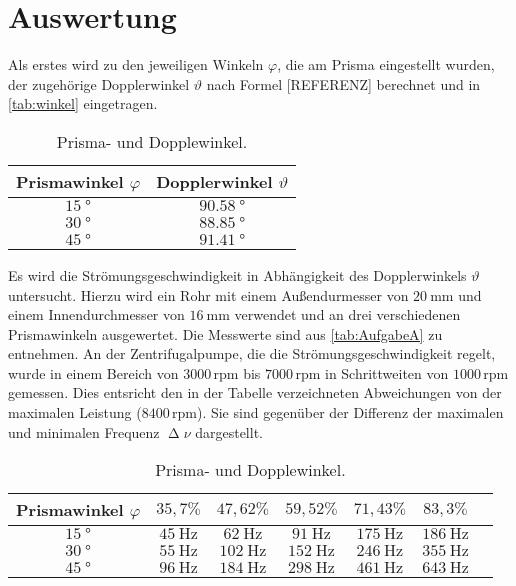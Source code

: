 \section{Auswertung}
\label{sec:Auswertung}

Als erstes wird zu den jeweiligen Winkeln $\varphi$, die am Prisma eingestellt wurden, der zugehörige Dopplerwinkel $\vartheta$ nach Formel [REFERENZ]
berechnet und in \autoref{tab:winkel} eingetragen.
\begin{table}[H]
  \centering
  \caption{Prisma- und Dopplewinkel.}
  \label{tab:winkel}
  \begin{tabular}{c c}
    \toprule
    Prismawinkel $\varphi$ & Dopplerwinkel $\vartheta$ \\
    \midrule
    $\SI{15}{\degree}$ & $\SI{90,58}{\degree}$ \\
    $\SI{30}{\degree}$ & $\SI{88,85}{\degree}$ \\
    $\SI{45}{\degree}$ & $\SI{91,41}{\degree}$ \\
    \bottomrule
  \end{tabular}
\end{table}

\noindent
Es wird die Strömungsgeschwindigkeit in Abhängigkeit des Dopplerwinkels $\vartheta$ untersucht. Hierzu wird ein Rohr mit einem Außendurmesser von $\SI{20}{\milli\meter}$
und einem Innendurchmesser von $\SI{16}{\milli\meter}$ verwendet und an drei verschiedenen Prismawinkeln ausgewertet. Die Messwerte sind aus \autoref{tab:AufgabeA} zu entnehmen.
An der Zentrifugalpumpe, die die Strömungsgeschwindigkeit regelt, wurde in einem Bereich von $3000 \,\text{rpm}$ bis $7000 \,\text{rpm}$ in Schrittweiten von $1000 \,\text{rpm}$ gemessen. Dies entsricht den in der
Tabelle verzeichneten Abweichungen von der maximalen Leistung ($8400\, \text{rpm}$). Sie sind gegenüber der Differenz der maximalen und minimalen Frequenz $\upDelta \nu$ dargestellt.
\begin{table}[H]
  \centering
  \caption{Prisma- und Dopplewinkel.}
  \label{tab:AufgabeA}
  \begin{tabular}{c c c c c c c}
    \toprule
    Prismawinkel $\varphi$ & $35,7 \%$ & $47,62 \%$ & $59,52 \%$ & $71,43 \%$ & $83,3 \%$\\
    \midrule
    $\SI{15}{\degree}$ & $\SI{45}{\hertz}$ & $\SI{62}{\hertz}$ & $\SI{91}{\hertz}$ & $\SI{175}{\hertz}$ & $\SI{186}{\hertz}$ \\
    $\SI{30}{\degree}$ & $\SI{55}{\hertz}$ & $\SI{102}{\hertz}$ & $\SI{152}{\hertz}$ & $\SI{246}{\hertz}$ & $\SI{355}{\hertz}$ \\
    $\SI{45}{\degree}$ & $\SI{96}{\hertz}$ & $\SI{184}{\hertz}$ & $\SI{298}{\hertz}$ & $\SI{461}{\hertz}$ & $\SI{643}{\hertz}$ \\
    \bottomrule
  \end{tabular}
\end{table}

